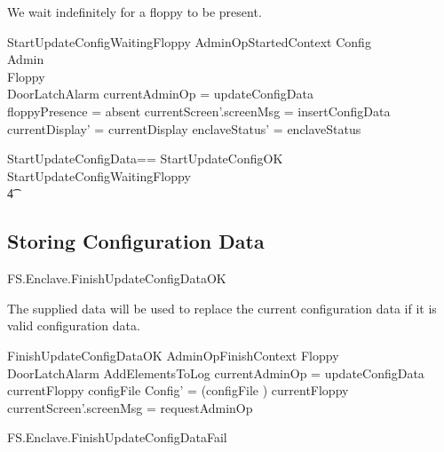 We wait indefinitely for a floppy to be present.

\begin{schema}{StartUpdateConfigWaitingFloppy}
        AdminOpStartedContext
\also   
        \Xi Config
\\      \Xi Admin 
\\      \Xi Floppy    
\\      \Xi DoorLatchAlarm
\where
        \The currentAdminOp = updateConfigData
\\      floppyPresence = absent
\also
        currentScreen'.screenMsg = insertConfigData
\\      currentDisplay' = currentDisplay
\also
        enclaveStatus' = enclaveStatus
\end{schema}

\begin{zed}
        StartUpdateConfigData== StartUpdateConfigOK  
         \lor StartUpdateConfigWaitingFloppy
\\ \t4  \lor
        [~ BadAdminLogout | enclaveStatus = waitingStartAdminOp 
\\ \t6  \land \The currentAdminOp = updateConfigData      ~]
\end{zed}

\subsection{Storing Configuration Data}

\begin{traceunit}{FS.Enclave.FinishUpdateConfigDataOK}
\end{traceunit}


The supplied data will be used to replace the current configuration data
if it is valid configuration data.

\begin{schema}{FinishUpdateConfigDataOK}
        AdminOpFinishContext
\also
        \Xi Floppy
\\      \Xi DoorLatchAlarm
\also
        AddElementsToLog
\where
        \The currentAdminOp = updateConfigData
\also        
        currentFloppy \in \ran configFile
\also
        \theta Config' = (configFile \inv) currentFloppy
\also
        currentScreen'.screenMsg = requestAdminOp
\end{schema}

\begin{traceunit}{FS.Enclave.FinishUpdateConfigDataFail}
\end{traceunit}


